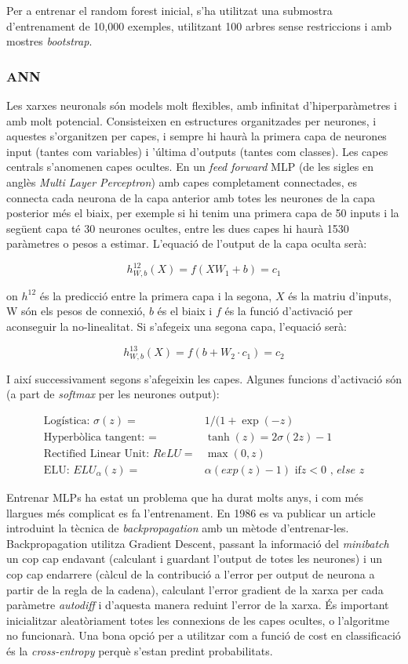\documentclass[12pt, spanish]{article}
\begin{document}
Per a entrenar el random forest inicial, s'ha utilitzat una submostra d'entrenament de 10,000 exemples, utilitzant 100 arbres sense restriccions i amb mostres \textit{bootstrap}. 

\subsubsection{ANN}

Les xarxes neuronals són models molt flexibles, amb infinitat d'hiperparàmetres i amb molt potencial. Consisteixen en estructures organitzades per neurones, i aquestes s'organitzen per capes, i sempre hi haurà la primera capa de neurones input (tantes com variables) i 'última d'outputs (tantes com classes). Les capes centrals s'anomenen capes ocultes. En un \textit{feed forward} MLP (de les sigles en anglès \textit{Multi Layer Perceptron}) amb capes completament connectades, es connecta cada neurona de la capa anterior amb totes les neurones de la capa posterior més el biaix, per exemple si hi tenim una primera capa de 50 inputs i la següent capa té 30 neurones ocultes, entre les dues capes hi haurà 1530 paràmetres o pesos  a estimar. L'equació de l'output de la capa oculta serà:

$$
h^{12}_{W,b}(X) = f(XW_1 + b) = c_1
$$

on $h^{12}$ és la predicció entre la primera capa i la segona, $X$ és la matriu d'inputs, W són els pesos de connexió, $b$ és el biaix i $f$ és la funció d'activació per aconseguir la no-linealitat. Si s'afegeix una segona capa, l'equació serà:

$$
h^{13}_{W,b}(X) = f(b + W_2 \cdot c_1) = c_2
$$

I així successivament segons s'afegeixin les capes. Algunes funcions d'activació són (a part de \textit{softmax} per les neurones output):
 
\begin{align*}
\text{Logística: }  \sigma(z) = & 1 / (1 + \exp(-z) \\
\text{Hyperbòlica tangent: } = & \tanh(z) = 2\sigma(2z) - 1\\
\text{Rectified Linear Unit: } ReLU = & \max(0, z) \\
\text{ELU: }  ELU_\alpha(z) = & \alpha(exp(z) - 1) \text{ if} z < 0\textit{ , else }z
\end{align*}

Entrenar MLPs ha estat un problema que ha durat molts anys, i com més llargues més complicat es fa l'entrenament. En 1986 es va publicar un article \cite{rumelhart1985learning} introduint la tècnica de \textit{backpropagation} amb un mètode d'entrenar-les. Backpropagation utilitza Gradient Descent, passant la informació del \textit{minibatch} un cop cap endavant (calculant i guardant l'output de totes les neurones) i un cop cap endarrere (càlcul de la contribució a l'error per output de neurona a partir de la regla de la cadena),  calculant l'error gradient de la xarxa per cada paràmetre \textit{autodiff} i d'aquesta manera reduint l'error de la xarxa. És important inicialitzar aleatòriament totes les connexions de les capes ocultes, o l'algoritme no funcionarà.  Una bona opció per a utilitzar com a funció de cost en classificació és la \textit{cross-entropy} perquè s'estan predint probabilitats.
\end{document}
